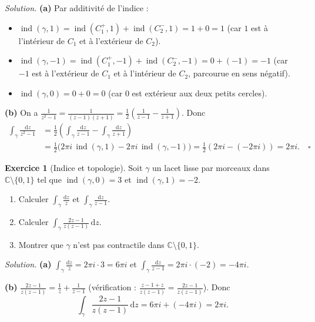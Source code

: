 \documentclass[12pt,a4paper,openany]{book}
\theoremstyle{definition}
\newtheorem{exercice}{Exercice}[chapter]
\theoremstyle{plain}
\theoremstyle{remark}
\newcommand{\C}{\mathbb{C}}
\DeclareMathOperator{\ind}{ind}
\newcommand{\dd}{\mathrm{d}}
\begin{document}
\noindent\textit{Solution.}\enspace
\textbf{(a)} Par additivité de l'indice :
\begin{itemize}
  \item $\ind(\gamma, 1) = \ind(C_1^+, 1) + \ind(C_2^-, 1) = 1 + 0 = 1$
    (car $1$ est à l'intérieur de $C_1$ et à l'extérieur de $C_2$).
  \item $\ind(\gamma, -1) = \ind(C_1^+, -1) + \ind(C_2^-, -1) = 0 + (-1) = -1$
    (car $-1$ est à l'extérieur de $C_1$ et à l'intérieur de $C_2$,
    parcourue en sens négatif).
  \item $\ind(\gamma, 0) = 0 + 0 = 0$ (car $0$ est extérieur aux deux petits
    cercles).
\end{itemize}

\textbf{(b)} On a $\frac{1}{z^2-1} = \frac{1}{(z-1)(z+1)} =
\frac{1}{2}\left(\frac{1}{z-1} - \frac{1}{z+1}\right)$. Donc
\begin{align*}
  \int_\gamma \frac{\dd z}{z^2-1}
  &= \frac{1}{2}\left(\int_\gamma \frac{\dd z}{z-1}
    - \int_\gamma \frac{\dd z}{z+1}\right) \\
  &= \frac{1}{2}\bigl(2\pi i\,\ind(\gamma,1) - 2\pi i\,\ind(\gamma,-1)\bigr)
  = \frac{1}{2}(2\pi i - (-2\pi i)) = 2\pi i. \quad\square
\end{align*}

\bigskip

\begin{exercice}[Indice et topologie]\label{exo:indice-topologie}
Soit $\gamma$ un lacet lisse par morceaux dans $\C \setminus \{0,1\}$ tel que
$\ind(\gamma, 0) = 3$ et $\ind(\gamma, 1) = -2$.
\begin{enumerate}[label=\textup{(\alph*)}]
  \item Calculer $\displaystyle\int_\gamma \frac{\dd z}{z}$ et
    $\displaystyle\int_\gamma \frac{\dd z}{z-1}$.
  \item Calculer $\displaystyle\int_\gamma \frac{2z-1}{z(z-1)}\,\dd z$.
  \item Montrer que $\gamma$ n'est pas contractile dans
    $\C \setminus \{0,1\}$.
\end{enumerate}
\end{exercice}

\noindent\textit{Solution.}\enspace
\textbf{(a)} $\int_\gamma \frac{\dd z}{z} = 2\pi i \cdot 3 = 6\pi i$ et
$\int_\gamma \frac{\dd z}{z-1} = 2\pi i \cdot (-2) = -4\pi i$.

\textbf{(b)} $\frac{2z-1}{z(z-1)} = \frac{1}{z} + \frac{1}{z-1}$
(vérification : $\frac{z-1+z}{z(z-1)} = \frac{2z-1}{z(z-1)}$). Donc
\[
  \int_\gamma \frac{2z-1}{z(z-1)}\,\dd z = 6\pi i + (-4\pi i) = 2\pi i.
\]
\end{document}
